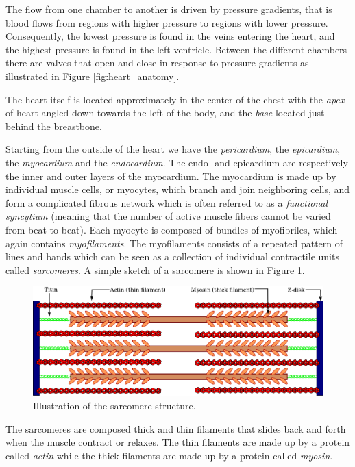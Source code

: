 The flow from one chamber to another is driven
by pressure gradients, that is blood flows from regions with higher
pressure to regions with lower pressure. Consequently, the lowest
pressure is found in the veins entering the heart, and the highest
pressure is found in the left ventricle. Between the different
chambers there are valves that open and close in response to pressure
gradients as illustrated in Figure \ref{fig:heart_anatomy}.


The heart itself is located approximately in the center of the chest
with the \emph{apex} of heart angled down towards the left of the
body, and the \emph{base} located just behind the breastbone.


Starting from the outside of the heart we have the \emph{pericardium},
the \emph{epicardium}, the \emph{myocardium} and the \emph{endocardium}. 
The endo- and epicardium are respectively the inner and outer layers of the
myocardium. The myocardium is made up by individual muscle cells, or
myocytes, which branch and join neighboring cells, and form a
complicated fibrous network which is often referred to as a 
\emph{functional syncytium} (meaning that the number of active muscle
fibers cannot be varied from beat to beat). Each myocyte is composed
of bundles of myofibriles, which again contains
\emph{myofilaments}. The myofilaments consists of a repeated pattern
of lines and bands which can be seen as a collection of individual
contractile units called \emph{sarcomeres}. A simple sketch of a
sarcomere is shown in Figure \ref{fig:sarcomere}. 
\begin{figure}[htbp]
  \centering
    \includegraphics[width=1.0\textwidth]{chapters/introduction/figures/Sarcomere.png}
\caption{Illustration of the sarcomere structure.}
\label{fig:sarcomere}
\end{figure}

The sarcomeres are composed thick and thin filaments that slides
back and forth when the muscle contract or relaxes.
The thin filaments are made up by a protein called \emph{actin} while
the thick filaments are made up by a protein called \emph{myosin}.

